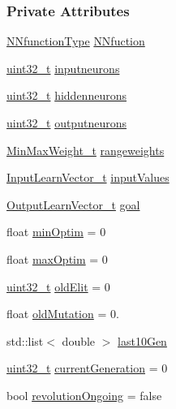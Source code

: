 \subsubsection*{Private Attributes}
\begin{DoxyCompactItemize}
\item 
\hyperlink{_soil_math_types_8h_a7791f1b8f92a964847637c5d657c1b10}{N\+Nfunction\+Type} \hyperlink{class_soil_math_1_1_g_a_a9b690048c89c32e3153457378b5e1c31}{N\+Nfuction}
\item 
\hyperlink{_soil_math_types_8h_a435d1572bf3f880d55459d9805097f62}{uint32\+\_\+t} \hyperlink{class_soil_math_1_1_g_a_ac32591e30dde5ac854ae57a7b9e33298}{inputneurons}
\item 
\hyperlink{_soil_math_types_8h_a435d1572bf3f880d55459d9805097f62}{uint32\+\_\+t} \hyperlink{class_soil_math_1_1_g_a_a3f1eee7492f68a05b9b06ee8afb2ec20}{hiddenneurons}
\item 
\hyperlink{_soil_math_types_8h_a435d1572bf3f880d55459d9805097f62}{uint32\+\_\+t} \hyperlink{class_soil_math_1_1_g_a_ab454f9968d5ce2a294b89f85c9d3a74f}{outputneurons}
\item 
\hyperlink{_soil_math_types_8h_aaa919636507bcd52b19efa301aa80b9a}{Min\+Max\+Weight\+\_\+t} \hyperlink{class_soil_math_1_1_g_a_a7613e87f93e42724d03008e3603cf21b}{rangeweights}
\item 
\hyperlink{_soil_math_types_8h_a45aa81992bf0ddf272907bd4fa0b96cf}{Input\+Learn\+Vector\+\_\+t} \hyperlink{class_soil_math_1_1_g_a_a99276ad62b9616d0f18becc4fbb22980}{input\+Values}
\item 
\hyperlink{_soil_math_types_8h_a2d8b5a261688166d724b68addd8561e6}{Output\+Learn\+Vector\+\_\+t} \hyperlink{class_soil_math_1_1_g_a_a4366c8f0852e8ec2bf37b3d5324b57cb}{goal}
\item 
float \hyperlink{class_soil_math_1_1_g_a_af8fab109094e0730304ba1c462b4e2bf}{min\+Optim} = 0
\item 
float \hyperlink{class_soil_math_1_1_g_a_a99565a1789513769c2cf0e6971854ef6}{max\+Optim} = 0
\item 
\hyperlink{_soil_math_types_8h_a435d1572bf3f880d55459d9805097f62}{uint32\+\_\+t} \hyperlink{class_soil_math_1_1_g_a_a9ee328c3a2d3f43b8fccabb06e5ebb18}{old\+Elit} = 0
\item 
float \hyperlink{class_soil_math_1_1_g_a_a437db38d6fdb7953a5d83f120b020130}{old\+Mutation} = 0.
\item 
std\+::list$<$ double $>$ \hyperlink{class_soil_math_1_1_g_a_a1e78adf31886d887ae192537e68aa236}{last10\+Gen}
\item 
\hyperlink{_soil_math_types_8h_a435d1572bf3f880d55459d9805097f62}{uint32\+\_\+t} \hyperlink{class_soil_math_1_1_g_a_ad1d08c52d5160714a997bcd30de028e3}{current\+Generation} = 0
\item 
bool \hyperlink{class_soil_math_1_1_g_a_a8883b6114388bb8a992b7f057ec565a8}{revolution\+Ongoing} = false
\end{DoxyCompactItemize}



